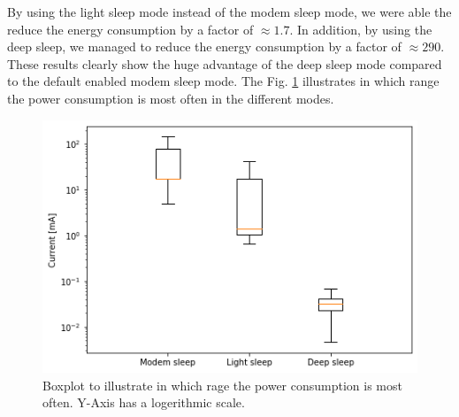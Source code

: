 By using the light sleep mode instead of the modem sleep mode, we were able the reduce the energy consumption by a factor of $\approx 1.7$.
In addition, by using the deep sleep, we managed to reduce the energy consumption by a factor of $\approx 290$.
These results clearly show the huge advantage of the deep sleep mode compared to the default enabled modem sleep mode.
The Fig. \ref{fig:sleep_compare_boxplot} illustrates in which range the power consumption is most often in the different modes.

\begin{figure}[h]
    \includegraphics[width = \linewidth]{fig/sleep_compare_boxplot.png}
    \caption{Boxplot to illustrate in which rage the power consumption is most often. Y-Axis has a logerithmic scale.}
    \label{fig:sleep_compare_boxplot}
\end{figure}